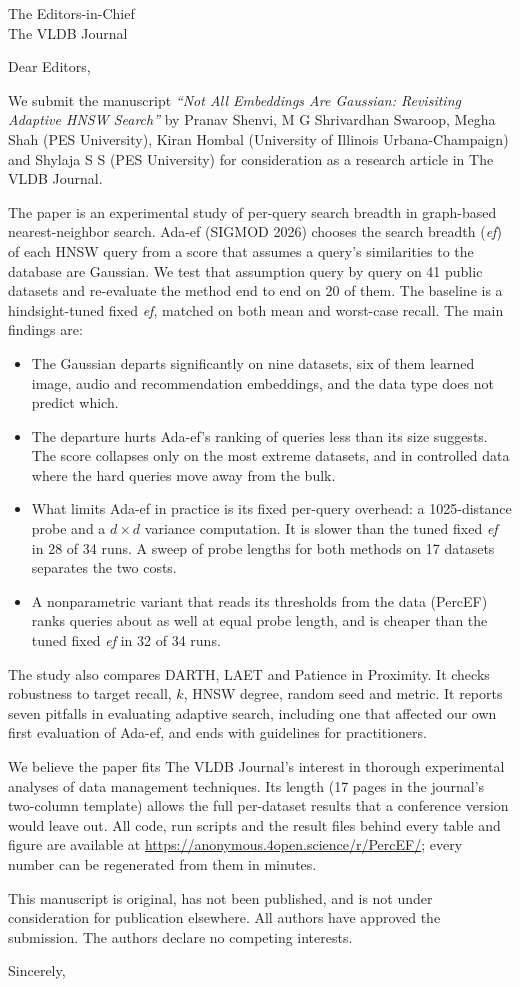 \documentclass[10pt]{letter}
\begin{document}
\begin{letter}{The Editors-in-Chief\\The VLDB Journal}
\opening{Dear Editors,}

We submit the manuscript \emph{``Not All Embeddings Are Gaussian: Revisiting Adaptive HNSW Search''}
by Pranav Shenvi, M G Shrivardhan Swaroop, Megha Shah (PES University), Kiran Hombal (University of
Illinois Urbana-Champaign) and Shylaja S S (PES University) for consideration as a research article in
The VLDB Journal.

The paper is an experimental study of per-query search breadth in graph-based nearest-neighbor
search. Ada-ef (SIGMOD 2026) chooses the search breadth (\emph{ef}) of each HNSW query from a score
that assumes a query's similarities to the database are Gaussian. We test that assumption query by
query on 41 public datasets and re-evaluate the method end to end on 20 of them. The baseline is a
hindsight-tuned fixed \emph{ef}, matched on both mean and worst-case recall. The main findings are:
\begin{itemize}
\item The Gaussian departs significantly on nine datasets, six of them learned image, audio and
  recommendation embeddings, and the data type does not predict which.
\item The departure hurts Ada-ef's ranking of queries less than its size suggests. The score
  collapses only on the most extreme datasets, and in controlled data where the hard queries move
  away from the bulk.
\item What limits Ada-ef in practice is its fixed per-query overhead: a 1025-distance probe and a
  $d \times d$ variance computation. It is slower than the tuned fixed \emph{ef} in 28 of 34 runs.
  A sweep of probe lengths for both methods on 17 datasets separates the two costs.
\item A nonparametric variant that reads its thresholds from the data (PercEF) ranks queries about as
  well at equal probe length, and is cheaper than the tuned fixed \emph{ef} in 32 of 34 runs.
\end{itemize}
The study also compares DARTH, LAET and Patience in Proximity. It checks robustness to target
recall, $k$, HNSW degree, random seed and metric. It reports seven pitfalls in evaluating adaptive
search, including one that affected our own first evaluation of Ada-ef, and ends with guidelines
for practitioners.

We believe the paper fits The VLDB Journal's interest in thorough experimental analyses of data
management techniques. Its length (17 pages in the journal's two-column template) allows the full
per-dataset results that a conference version would leave out. All code, run scripts and the result
files behind every table and figure are available at
\url{https://anonymous.4open.science/r/PercEF/}; every number can be regenerated from them in minutes.

This manuscript is original, has not been published, and is not under consideration for publication
elsewhere. All authors have approved the submission. The authors declare no competing interests.

\closing{Sincerely,}
\end{letter}
\end{document}
